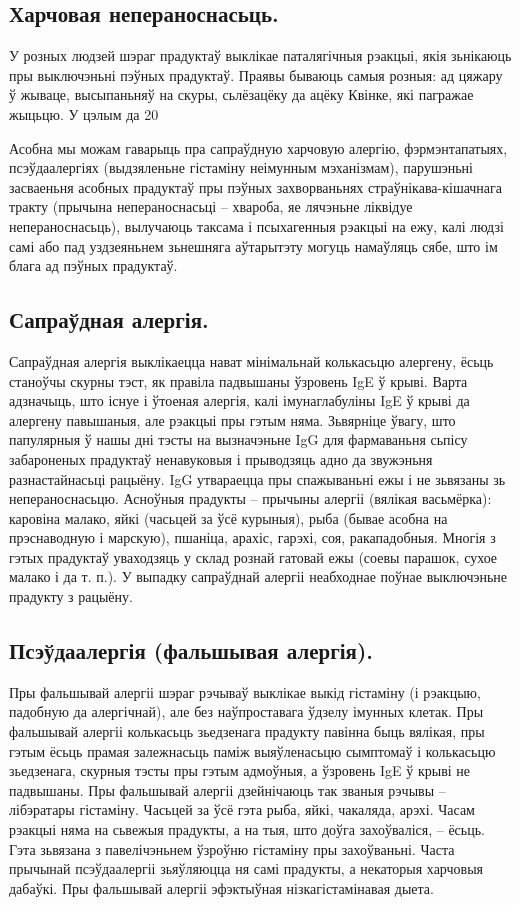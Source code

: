 \subsection{Харчовая непераноснасьць.}
У розных людзей шэраг прадуктаў выклікае паталягічныя рэакцыі, якія зьнікаюць пры выключэньні пэўных прадуктаў. Праявы бываюць самыя розныя: ад цяжару ў жываце, высыпаньняў на скуры, сьлёзацёку да ацёку Квінке, які пагражае жыцьцю. У цэлым да 20%

Асобна мы можам гаварыць пра сапраўдную харчовую алергію, фэрмэнтапатыях, псэўдаалергіях (выдзяленьне гістаміну неімунным мэханізмам), парушэньні засваеньня асобных прадуктаў пры пэўных захворваньнях страўнікава-кішачнага тракту (прычына непераноснасьці – хвароба, яе лячэньне ліквідуе непераноснасьць), вылучаюць таксама і псыхагенныя рэакцыі на ежу, калі людзі самі або пад уздзеяньнем зьнешняга аўтарытэту могуць намаўляць сябе, што ім блага ад пэўных прадуктаў.

\subsection{Сапраўдная алергія.}
Сапраўдная алергія выклікаецца нават мінімальнай колькасьцю алергену, ёсьць станоўчы скурны тэст, як правіла падвышаны ўзровень IgE ў крыві. Варта адзначыць, што існуе і ўтоеная алергія, калі імунаглабуліны IgE ў крыві да алергену павышаныя, але рэакцыі пры гэтым няма. Зьвярніце ўвагу, што папулярныя ў нашы дні тэсты на вызначэньне IgG для фармаваньня сьпісу забароненых прадуктаў ненавуковыя і прыводзяць адно да звужэньня разнастайнасьці рацыёну. IgG утвараецца пры спажываньні ежы і не зьвязаны зь непераноснасьцю. Асноўныя прадукты – прычыны алергіі (вялікая васьмёрка): каровіна малако, яйкі (часьцей за ўсё курыныя), рыба (бывае асобна на прэснаводную і марскую), пшаніца, арахіс, гарэхі, соя, ракападобныя. Многія з гэтых прадуктаў уваходзяць у склад рознай гатовай ежы (соевы парашок, сухое малако і да т. п.). У выпадку сапраўднай алергіі неабходнае поўнае выключэньне прадукту з рацыёну.

\subsection{Псэўдаалергія (фальшывая алергія).}
Пры фальшывай алергіі шэраг рэчываў выклікае выкід гістаміну (і рэакцыю, падобную да алергічнай), але без наўпроставага ўдзелу імунных клетак. Пры фальшывай алергіі колькасьць зьедзенага прадукту павінна быць вялікая, пры гэтым ёсьць прамая залежнасьць паміж выяўленасьцю сымптомаў і колькасьцю зьедзенага, скурныя тэсты пры гэтым адмоўныя, а ўзровень IgE ў крыві не падвышаны. Пры фальшывай алергіі дзейнічаюць так званыя рэчывы – лібэратары гістаміну. Часьцей за ўсё гэта рыба, яйкі, чакаляда, арэхі. Часам рэакцыі няма на сьвежыя прадукты, а на тыя, што доўга захоўваліся, – ёсьць. Гэта зьвязана з павелічэньнем ўзроўню гістаміну пры захоўваньні. Часта прычынай псэўдаалергіі зьяўляюцца ня самі прадукты, а некаторыя харчовыя дабаўкі. Пры фальшывай алергіі эфэктыўная нізкагістамінавая дыета.

